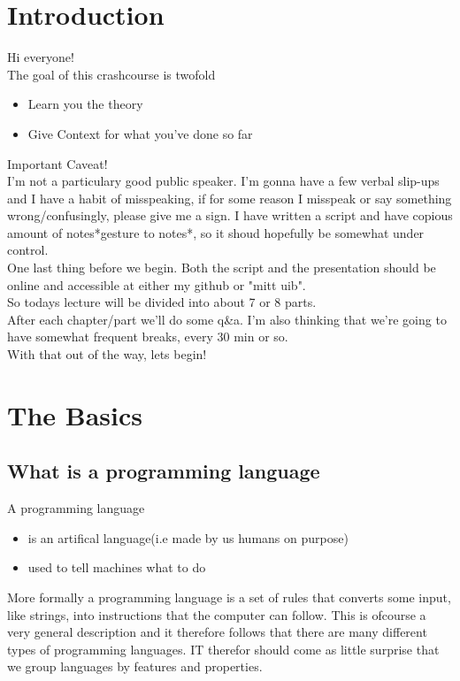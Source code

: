 \documentclass{article}
\begin{document}
    \section{Introduction}
        Hi everyone!\\
        The goal of this crashcourse is twofold
        \begin{itemize}
            \item Learn you the theory
            \item Give Context for what you've done so far
        \end{itemize}
        Important Caveat!\\
        I'm not a particulary good public speaker. I'm gonna have a few verbal slip-ups and I have a habit of misspeaking,
        if for some reason I misspeak or say something wrong/confusingly, please give me a sign.
        I have written a script and have copious amount of notes{*gesture to notes*}, so it shoud hopefully be somewhat under control.\\
        One last thing before we begin. Both the script and the presentation should be online and accessible at either my github or "mitt uib".\\
        So todays lecture will be divided into about 7 or 8 parts. \\
        After each chapter/part we'll do some q\&a. 
        I'm also thinking that we're going to have somewhat frequent breaks, every 30 min or so.\\
        With that out of the way, lets begin!
    \section{The Basics}
    \subsection{What is a programming language}
        A programming language 
        \begin{itemize}
            \item is an artifical language(i.e made by us humans on purpose)
            \item used to tell machines what to do
        \end{itemize}
        More formally a programming language is a set of rules that converts some input, like strings, into instructions that the computer 
        can follow.
        This is ofcourse a very general description and it therefore follows that there are many different types of programming languages.
        IT therefor should come as little surprise that we group languages by features and properties. 
\end{document}
